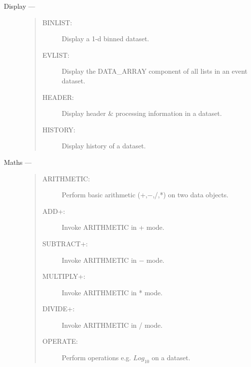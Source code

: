 \begin{description}
\item [Display ---]
\begin{quote}
\begin{description}
\item [BINLIST:]   Display a 1-d binned dataset.
\item [EVLIST:]    Display the DATA\_ARRAY component of all lists in an event dataset.
\item [HEADER:]    Display header \& processing information in a dataset.
\item [HISTORY:]   Display history of a dataset.
\end{description}
\end{quote}

\item [Maths ---]
\begin{quote}
\begin{description}
\item [ARITHMETIC:]  Perform basic arithmetic (+,$-$,/,*) on two data objects.
\item [ADD+:]        Invoke ARITHMETIC in + mode.
\item [SUBTRACT+:]   Invoke ARITHMETIC in $-$ mode.
\item [MULTIPLY+:]   Invoke ARITHMETIC in * mode.
\item [DIVIDE+:]     Invoke ARITHMETIC in / mode.
\item [OPERATE:]     Perform operations e.g. $Log_{10}$ on a dataset.
\end{description}
\end{quote}


\end{description}
